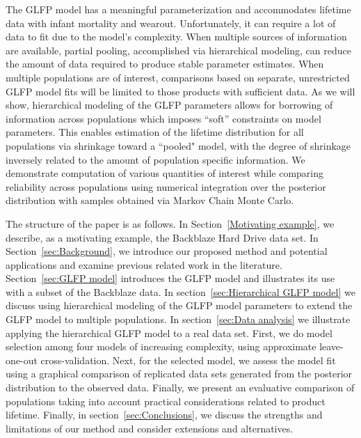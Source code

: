 \documentclass[12pt]{article}
\begin{document}
The GLFP model has a meaningful parameterization and accommodates lifetime data with infant mortality and wearout.  Unfortunately, it can require a lot of data to fit due to the model's complexity. When multiple sources of information are available, partial pooling, accomplished via hierarchical modeling, can reduce the amount of data required to produce stable parameter estimates. When multiple populations are of interest, comparisons based on separate, unrestricted GLFP model fits will be limited to those products with sufficient data. As we will show, hierarchical modeling of the GLFP parameters allows for borrowing of information across populations which imposes ``soft'' constraints on model parameters. This enables estimation of the lifetime distribution for all populations via shrinkage toward a ``pooled" model, with the degree of shrinkage inversely related to the amount of population specific information. We demonstrate computation of various quantities of interest while comparing reliability across populations using numerical integration over the posterior distribution with samples obtained via  Markov Chain Monte Carlo. 

The structure of the paper is as follows. In Section~\ref{Motivating example}, we describe, as a motivating example, the Backblaze Hard Drive data set. In Section~\ref{sec:Background}, we introduce our proposed method and potential applications and examine previous related work in the literature. Section~\ref{sec:GLFP model} introduces the GLFP model and illustrates its use with a subset of the Backblaze data. In section~\ref{sec:Hierarchical GLFP model} we discuss using hierarchical modeling of the GLFP model parameters to extend the GLFP model to multiple populations. In section~\ref{sec:Data analysis} we illustrate applying the hierarchical GLFP model to a real data set. First, we do model selection among four models of increasing complexity, using approximate leave-one-out cross-validation. Next, for the selected model, we assess the model fit using a graphical comparison of replicated data sets generated from the posterior distribution to the observed data. Finally, we present an evaluative comparison of populations taking into account practical considerations related to product lifetime. Finally, in section~\ref{sec:Conclusions}, we discuss the strengths and limitations of our method and consider extensions and alternatives.
\end{document}
